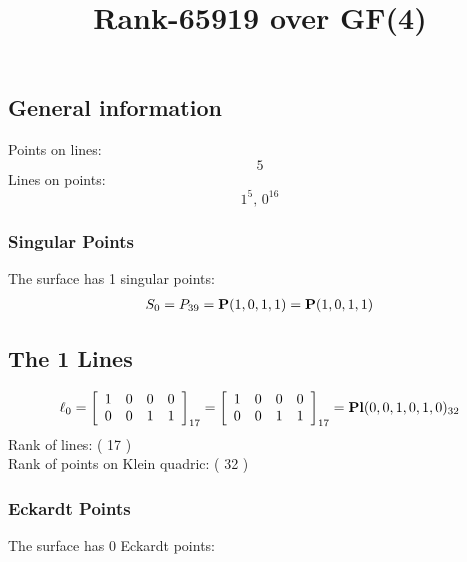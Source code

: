\documentclass{article}
\newcommand\setTBstruts{\def\T{\rule{0pt}{2.6ex}}%
\def\B{\rule[-1.2ex]{0pt}{0pt}}}
\newcommand{\bP}{{\bf P}}
\begin{document}
 
\setTBstruts



{\allowdisplaybreaks%






\title{Rank-65919 over GF(4)}
\author{}%
\maketitle%
%
{}



\subsection*{General information}
Points on lines:
$$
5$$
Lines on points:
$$
1^5,\,0^{16}$$
\subsubsection*{Singular Points}
The surface has 1 singular points:\\
\begin{align*}
S_{0} &= P_{39}=\bP(1, 0, 1, 1) = \bP(1, 0, 1, 1)\\
\end{align*}
\subsection*{The 1 Lines}
$$
\ell_{0} = 
\left[
\begin{array}{*{4}{r}}
1 & 0 & 0 & 0\\
0 & 0 & 1 & 1\\
\end{array}
\right]
_{17}
=
\left[
\begin{array}{*{4}c}
1  & 0  & 0  & 0\\
0  & 0  & 1  & 1\\
\end{array}
\right]_{17}
={\rm\bf Pl}(0,0,1,0,1,0 )_{32}$$
Rank of lines: ( 17 )\\
Rank of points on Klein quadric: ( 32 )\\
\subsubsection*{Eckardt Points}
The surface has 0 Eckardt points:\\
}
\end{document}
